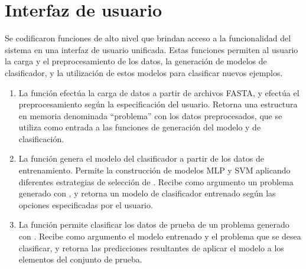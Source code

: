%
%
%
\section{Interfaz de usuario}
%
Se codificaron funciones de alto nivel que brindan acceso a la
funcionalidad del sistema en una interfaz de usuario unificada.
Estas funciones permiten al usuario la carga y el preprocesamiento de
los datos, la generación de modelos de clasificador, y la utilización
de estos modelos para clasificar nuevos ejemplos.
%
\begin{enumerate}
\item
  La función  efectúa la carga de datos a partir de
  archivos FASTA, y efectúa el preprocesamiento según la
  especificación del usuario.
  Retorna una estructura en memoria denominada ``problema'' con los
  datos preprocesados, que se utiliza como entrada a las funciones de
  generación del modelo y de clasificación.
\item
  La función  genera el modelo del clasificador a
  partir de los datos de entrenamiento.
  Permite la construcción de modelos MLP y SVM aplicando diferentes
  estrategias de selección de .
  Recibe como argumento un problema generado con ,
  y retorna un modelo de clasificador entrenado según las opciones
  especificadas por el usuario.
\item
  La función  permite clasificar los datos de
  prueba de un problema generado con .
  Recibe como argumento el modelo entrenado y el problema que se desea
  clasificar, y retorna las predicciones resultantes de aplicar el
  modelo a los elementos del conjunto de prueba.
\end{enumerate}
%

